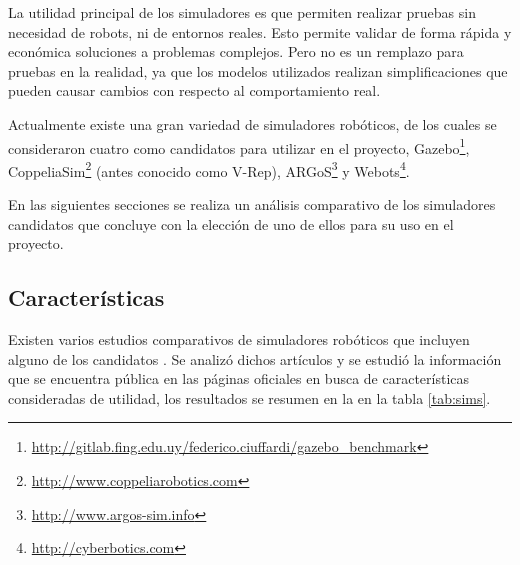 La utilidad principal de los simuladores es que permiten realizar pruebas sin
necesidad de robots, ni de entornos reales. Esto permite validar de forma
rápida y económica soluciones a problemas complejos. Pero no es un remplazo
para  pruebas en la realidad, ya que los modelos utilizados realizan
simplificaciones que pueden causar cambios con respecto al comportamiento
real.

Actualmente existe una gran variedad de simuladores robóticos, de los cuales se consideraron
cuatro como candidatos para utilizar en el proyecto, Gazebo\footnote{\url{http://gitlab.fing.edu.uy/federico.ciuffardi/gazebo_benchmark}},
CoppeliaSim\footnote{\url{http://www.coppeliarobotics.com}} (antes conocido como V-Rep), ARGoS\footnote{\url{http://www.argos-sim.info}}
y Webots\footnote{\url{http://cyberbotics.com}}.


En las siguientes secciones se realiza un análisis comparativo de los simuladores
candidatos que concluye con la elección de uno de ellos para su uso en el
proyecto.

\subsection{Características}

Existen varios estudios comparativos de simuladores robóticos que incluyen
alguno de los candidatos \cite{Nogueira2014, SantosPessoadeMelo2019,
ramli2015overview, Pitonakova2018}. 
Se analizó dichos artículos y se estudió la información que se encuentra pública
en las páginas oficiales en busca de características consideradas de utilidad, los resultados se resumen en la  
en la tabla \ref{tab:sims}. 

